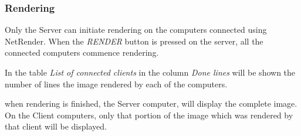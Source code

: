 \subsubsection{Rendering}\label{rendering}

Only the Server can initiate rendering on the computers connected using
NetRender. When the \emph{RENDER} button is pressed on the server, all the
connected computers commence rendering.

In the table \emph{List of connected clients} in the column \emph{Done lines} will be
shown the number of lines the image rendered by each of the computers.

when rendering is finished, the Server computer, will display the complete
image. On the Client computers, only that portion of the image which was
rendered by that client will be displayed.
